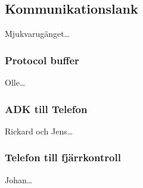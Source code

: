 \subsection{Kommunikationslank}
Mjukvarugänget\ldots
\subsubsection{Protocol buffer}
Olle\ldots
\subsubsection{ADK till Telefon}
Rickard och Jens\ldots
\subsubsection{Telefon till fjärrkontroll}
Johan\ldots
